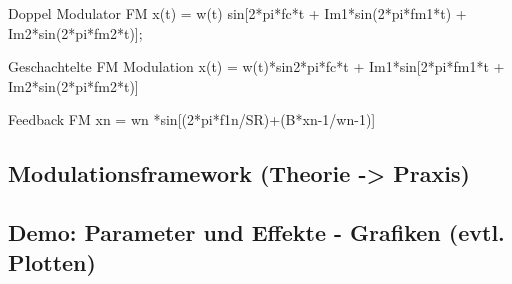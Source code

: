 Doppel Modulator FM
x(t) = w(t) sin[2*pi*fc*t + Im1*sin(2*pi*fm1*t) + Im2*sin(2*pi*fm2*t)];

Geschachtelte FM Modulation
x(t) = w(t)*sin{2*pi*fc*t + Im1*sin[2*pi*fm1*t + Im2*sin(2*pi*fm2*t)]}

Feedback FM 
xn = wn *sin[(2*pi*f1n/SR)+(B*xn-1/wn-1)]

\FloatBarrier
\subsection{Modulationsframework (Theorie -> Praxis)}
\FloatBarrier
\subsection{Demo: Parameter und Effekte - Grafiken (evtl. Plotten)}